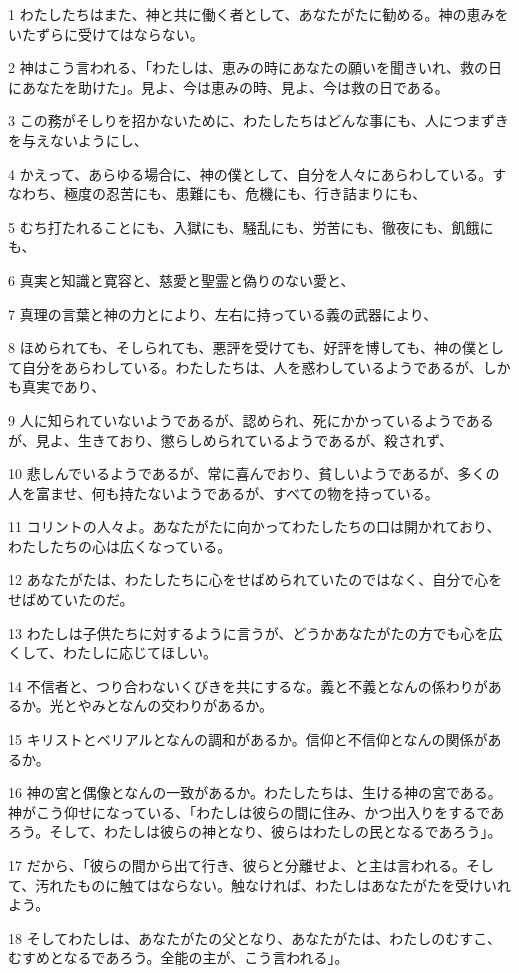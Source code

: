 \par 1 わたしたちはまた、神と共に働く者として、あなたがたに勧める。神の恵みをいたずらに受けてはならない。
\par 2 神はこう言われる、「わたしは、恵みの時にあなたの願いを聞きいれ、救の日にあなたを助けた」。見よ、今は恵みの時、見よ、今は救の日である。
\par 3 この務がそしりを招かないために、わたしたちはどんな事にも、人につまずきを与えないようにし、
\par 4 かえって、あらゆる場合に、神の僕として、自分を人々にあらわしている。すなわち、極度の忍苦にも、患難にも、危機にも、行き詰まりにも、
\par 5 むち打たれることにも、入獄にも、騒乱にも、労苦にも、徹夜にも、飢餓にも、
\par 6 真実と知識と寛容と、慈愛と聖霊と偽りのない愛と、
\par 7 真理の言葉と神の力とにより、左右に持っている義の武器により、
\par 8 ほめられても、そしられても、悪評を受けても、好評を博しても、神の僕として自分をあらわしている。わたしたちは、人を惑わしているようであるが、しかも真実であり、
\par 9 人に知られていないようであるが、認められ、死にかかっているようであるが、見よ、生きており、懲らしめられているようであるが、殺されず、
\par 10 悲しんでいるようであるが、常に喜んでおり、貧しいようであるが、多くの人を富ませ、何も持たないようであるが、すべての物を持っている。
\par 11 コリントの人々よ。あなたがたに向かってわたしたちの口は開かれており、わたしたちの心は広くなっている。
\par 12 あなたがたは、わたしたちに心をせばめられていたのではなく、自分で心をせばめていたのだ。
\par 13 わたしは子供たちに対するように言うが、どうかあなたがたの方でも心を広くして、わたしに応じてほしい。
\par 14 不信者と、つり合わないくびきを共にするな。義と不義となんの係わりがあるか。光とやみとなんの交わりがあるか。
\par 15 キリストとベリアルとなんの調和があるか。信仰と不信仰となんの関係があるか。
\par 16 神の宮と偶像となんの一致があるか。わたしたちは、生ける神の宮である。神がこう仰せになっている、「わたしは彼らの間に住み、かつ出入りをするであろう。そして、わたしは彼らの神となり、彼らはわたしの民となるであろう」。
\par 17 だから、「彼らの間から出て行き、彼らと分離せよ、と主は言われる。そして、汚れたものに触てはならない。触なければ、わたしはあなたがたを受けいれよう。
\par 18 そしてわたしは、あなたがたの父となり、あなたがたは、わたしのむすこ、むすめとなるであろう。全能の主が、こう言われる」。

